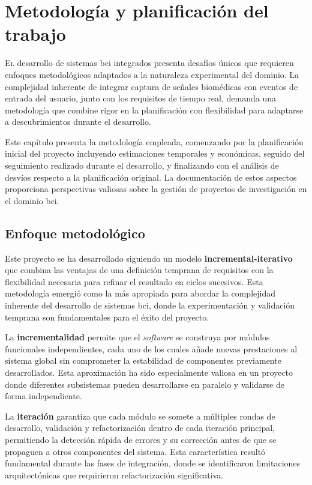 \chapter[Metodología y planificación]{Metodología y planificación del trabajo}
\label{chap:metodologia}

\lettrine{E}{l} desarrollo de sistemas \acrshort{bci} integrados presenta desafíos únicos que requieren enfoques metodológicos adaptados a la naturaleza experimental del dominio. La complejidad inherente de integrar captura de señales biomédicas con eventos de entrada del usuario, junto con los requisitos de tiempo real, demanda una metodología que combine rigor en la planificación con flexibilidad para adaptarse a descubrimientos durante el desarrollo.

Este capítulo presenta la metodología empleada, comenzando por la planificación inicial del proyecto incluyendo estimaciones temporales y económicas, seguido del seguimiento realizado durante el desarrollo, y finalizando con el análisis de desvíos respecto a la planificación original. La documentación de estos aspectos proporciona perspectivas valiosas sobre la gestión de proyectos de investigación en el dominio \acrshort{bci}.

\section{Enfoque metodológico}
\label{sec:enfoque_metodologico}

Este proyecto se ha desarrollado siguiendo un modelo \textbf{incremental-iterativo} que combina las ventajas de una definición temprana de requisitos con la flexibilidad necesaria para refinar el resultado en ciclos sucesivos. Esta metodología emergió como la más apropiada para abordar la complejidad inherente del desarrollo de sistemas \acrshort{bci}, donde la experimentación y validación temprana son fundamentales para el éxito del proyecto.

La \textbf{incrementalidad} permite que el \textit{software} se construya por módulos funcionales independientes, cada uno de los cuales añade nuevas prestaciones al sistema global sin comprometer la estabilidad de componentes previamente desarrollados. Esta aproximación ha sido especialmente valiosa en un proyecto donde diferentes subsistemas pueden desarrollarse en paralelo y validarse de forma independiente.

La \textbf{iteración} garantiza que cada módulo se somete a múltiples rondas de desarrollo, validación y refactorización dentro de cada iteración principal, permitiendo la detección rápida de errores y su corrección antes de que se propaguen a otros componentes del sistema. Esta característica resultó fundamental durante las fases de integración, donde se identificaron limitaciones arquitectónicas que requirieron refactorización significativa.

